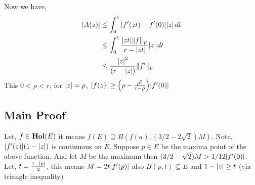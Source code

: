 \documentclass[../ComplexAnalysis_Notes.tex]{subfiles}
\begin{document}
Now we have, 
\begin{align*}
    \abs{A(z)} &\leq\int_{0}^{1} \abs{f'(zt)-f'(0)}\abs{z} \, dt \\
    &\leq \int_0^1  \frac{\abs{zt}\norm{f}_V}{r-\abs{zt}} \abs{z} \, dt\\
    & \leq \frac{\abs{z}^2}{(r-\abs{z})} \norm{f'}_{V}
\end{align*}
This $0 <\rho <r$, for $\abs{z}=\rho$, $\abs{f(z)} \geq \qty(\rho - \frac{\rho^2}{r-\rho})\abs{f'(0)}$

\subsection*{Main Proof}
Let, $f \in \operatorname{\mathbf{Hol}}(E)$ it means $f(E)\supseteq B(f(a),(3/2-2\sqrt{2})M)$. Note, $\abs{f'(z)}(1-\abs{z})$ is continuous on $\bar{E}$. Suppose $p\in E$ be the maxima point of the above function. And let $M$ be the maximum then $(3/2-\sqrt{2})M > 1/12 \abs{f'(0)}$. Let, $t = \frac{1-\abs{p}}{2}$, this means $M = 2t \abs{f'(p)}$ also $B(p,t) \subseteq E$ and $1-\abs{z}\geq t$ (via triangle inequality)
\end{document}
